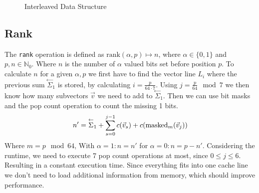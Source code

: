 \documentclass[a4paper,UKenglish,cleveref, autoref, thm-restate]{lipics-v2021}
\def\code#1{\texttt{#1}}
\newcommand\prevsum[0]{\ensuremath{\overset{\leftarrow}{\Sigma}_1}}
\begin{document}
\begin{figure}[htbp]
    \centering
    \tikzfading[name=fade right,
            left color=transparent!0,
            right color=transparent!100]
        \tikzfading[name=fade left,
            left color=transparent!100,
            right color=transparent!0]
    \caption{Interleaved Data Structure}
    \label{fig:interleaved}    
\end{figure}

\subsection{Rank}
The \code{rank} operation is defined as $\text{rank}(\alpha, p) \mapsto n$, where $\alpha \in \{0,1\}$
and $p,n \in \mathbb{N}_0$. Where $n$ is the number of $\alpha$ valued bits set before position $p$.
To calculate $n$ for a given $\alpha, p$ we first have to find the vector line $L_i$ where the
previous sum $\prevsum$ is stored, by calculating $i=\frac{p}{64 \cdot 7}$.
Using $j = \frac{p}{64} \mod 7$ we then know how many subvectors $\vec{v}$ we need to add to $\prevsum$.
Then we can use bit masks and the pop count operation to count the missing 1 bits.
$$
    n' = \prevsum + \sum_{s=0}^{j-1}c(\vec{v}_s) + c(\text{masked}_{m}(\vec{v}_j))\\
$$
Where $m = p \mod 64$, With $\alpha = 1: n = n'$ for $\alpha = 0: n = p - n'$.
Considering the runtime, we need to execute 7 pop count operations at most, since $0 \leq j \leq 6$.
Resulting in a constant execution time.
Since everything fits into one cache line we don't need to load additional information from memory,
which should improve performance.
\end{document}
